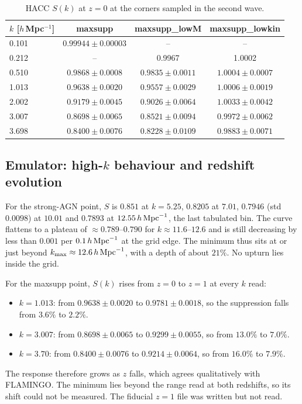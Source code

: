 \documentclass[11pt,a4paper]{article}
\begin{document}
\begin{table}
\centering
\begin{tabular}{lccc}
\toprule
$k$ [$h\,$Mpc$^{-1}$] & maxsupp & maxsupp\_lowM & maxsupp\_lowkin\\
\midrule
0.101 & $0.99944\pm0.00003$ & -- & --\\
0.212 & -- & 0.9967 & 1.0002\\
0.510 & $0.9868\pm0.0008$ & $0.9835\pm0.0011$ & $1.0004\pm0.0007$\\
1.013 & $0.9638\pm0.0020$ & $0.9557\pm0.0029$ & $1.0006\pm0.0019$\\
2.002 & $0.9179\pm0.0045$ & $0.9026\pm0.0064$ & $1.0033\pm0.0042$\\
3.007 & $0.8698\pm0.0065$ & $0.8521\pm0.0094$ & $0.9972\pm0.0062$\\
3.698 & $0.8400\pm0.0076$ & $0.8228\pm0.0109$ & $0.9883\pm0.0071$\\
\bottomrule
\end{tabular}
\caption{HACC $S(k)$ at $z=0$ at the corners sampled in the second wave.}
\label{tab:corners}
\end{table}

\subsection{Emulator: high-$k$ behaviour and redshift evolution}
For the strong-AGN point, $S$ is $0.851$ at $k=5.25$, $0.8205$ at $7.01$, $0.7946$ (std $0.0098$) at $10.01$ and $0.7893$ at $12.55\,h\,{\rm Mpc}^{-1}$, the last tabulated bin. The curve flattens to a plateau of $\approx0.789$--$0.790$ for $k\approx11.6$--$12.6$ and is still decreasing by less than $0.001$ per $0.1\,h\,{\rm Mpc}^{-1}$ at the grid edge. The minimum thus sits at or just beyond $k_{\rm max}\approx12.6\,h\,{\rm Mpc}^{-1}$, with a depth of about $21\%$. No upturn lies inside the grid.

For the maxsupp point, $S(k)$ rises from $z=0$ to $z=1$ at every $k$ read:
\begin{itemize}
\item $k=1.013$: from $0.9638\pm0.0020$ to $0.9781\pm0.0018$, so the suppression falls from $3.6\%$ to $2.2\%$.
\item $k=3.007$: from $0.8698\pm0.0065$ to $0.9299\pm0.0055$, so from $13.0\%$ to $7.0\%$.
\item $k=3.70$: from $0.8400\pm0.0076$ to $0.9214\pm0.0064$, so from $16.0\%$ to $7.9\%$.
\end{itemize}
The response therefore grows as $z$ falls, which agrees qualitatively with FLAMINGO. The minimum lies beyond the range read at both redshifts, so its shift could not be measured. The fiducial $z=1$ file was written but not read.
\end{document}
